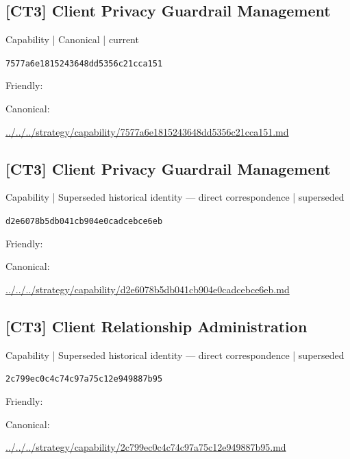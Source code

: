\documentclass[10pt,a4paper]{article}
\begin{document}
\subsection*{[CT3] Client Privacy Guardrail Management}
{\small Capability | Canonical | current}\par
\texttt{7577a6e1815243648dd5356c21cca151}\par
Friendly: \par
Canonical: \par
{\footnotesize\url{../../../strategy/capability/7577a6e1815243648dd5356c21cca151.md}}\par
\subsection*{[CT3] Client Privacy Guardrail Management}
{\small Capability | Superseded historical identity — direct correspondence | superseded}\par
\texttt{d2e6078b5db041cb904e0cadcebce6eb}\par
Friendly: \par
Canonical: \par
{\footnotesize\url{../../../strategy/capability/d2e6078b5db041cb904e0cadcebce6eb.md}}\par
\subsection*{[CT3] Client Relationship Administration}
{\small Capability | Superseded historical identity — direct correspondence | superseded}\par
\texttt{2c799ec0c4c74c97a75c12e949887b95}\par
Friendly: \par
Canonical: \par
{\footnotesize\url{../../../strategy/capability/2c799ec0c4c74c97a75c12e949887b95.md}}\par
\end{document}

